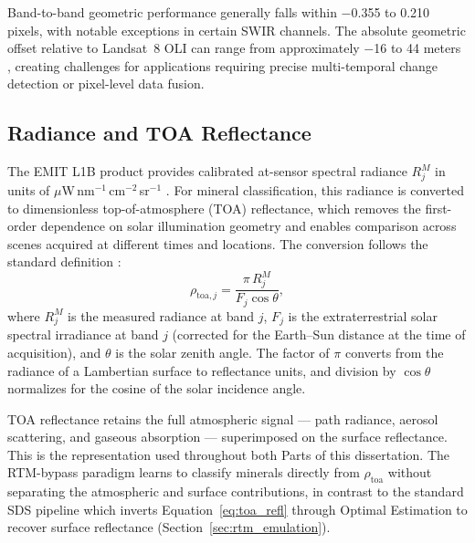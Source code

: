\documentclass[11pt]{report}
\begin{document}
Band-to-band geometric performance generally falls within $-$0.355 to 0.210 pixels, with notable exceptions in certain SWIR channels. The absolute geometric offset relative to Landsat~8 OLI can range from approximately $-$16 to 44 meters \cite{usgs_emit_syschar}, creating challenges for applications requiring precise multi-temporal change detection or pixel-level data fusion.

\subsection{Radiance and TOA Reflectance}
\label{sec:radiance_toa}

The EMIT L1B product provides calibrated at-sensor spectral radiance $R_j^M$ in units of $\mu$W\,nm$^{-1}$\,cm$^{-2}$\,sr$^{-1}$ \cite{emit_l1b_atbd}. For mineral classification, this radiance is converted to dimensionless top-of-atmosphere (TOA) reflectance, which removes the first-order dependence on solar illumination geometry and enables comparison across scenes acquired at different times and locations. The conversion follows the standard definition \cite{emit_l2a_atbd}:
\begin{equation}
\rho_{\text{toa},j} = \frac{\pi \, R_j^M}{F_j \cos\theta},
\label{eq:toa_refl}
\end{equation}
where $R_j^M$ is the measured radiance at band $j$, $F_j$ is the extraterrestrial solar spectral irradiance at band $j$ (corrected for the Earth--Sun distance at the time of acquisition), and $\theta$ is the solar zenith angle. The factor of $\pi$ converts from the radiance of a Lambertian surface to reflectance units, and division by $\cos\theta$ normalizes for the cosine of the solar incidence angle.

TOA reflectance retains the full atmospheric signal --- path radiance, aerosol scattering, and gaseous absorption --- superimposed on the surface reflectance. This is the representation used throughout both Parts of this dissertation. The RTM-bypass paradigm learns to classify minerals directly from $\rho_{\text{toa}}$ without separating the atmospheric and surface contributions, in contrast to the standard SDS pipeline which inverts Equation~\ref{eq:toa_refl} through Optimal Estimation to recover surface reflectance (Section~\ref{sec:rtm_emulation}).

\end{document}
